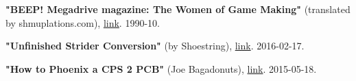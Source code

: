 \begin{thebibliography}{999}
  \textbf{"BEEP! Megadrive magazine: The Women of Game Making"} (translated by shmuplations.com),
  \href{https://shmuplations.com/womenofgamedesign/}{link}.
  1990-10.

  \textbf{"Unfinished Strider Conversion"} (by Shoestring),
  \href{https://www.jammarcade.net/strider-conversion/}{link}.
  2016-02-17.

  \textbf{"How to Phoenix a CPS 2 PCB"} (Joe Bagadonuts),
  \href{https://www.youtube.com/watch?v=HFj8Mkw_kog}{link}.
  2015-05-18.


\end{thebibliography}